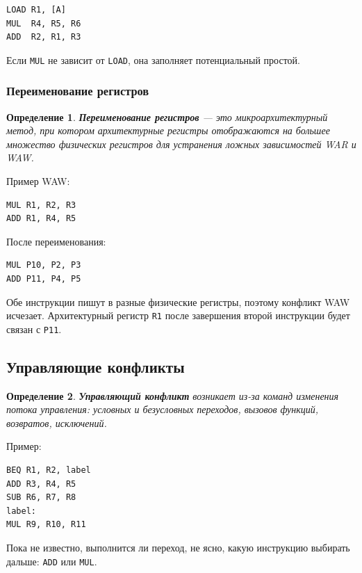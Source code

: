 \documentclass[12pt,a4paper]{article}
\newtheorem{definition}{Определение}
\begin{document}
\begin{lstlisting}
LOAD R1, [A]
MUL  R4, R5, R6
ADD  R2, R1, R3
\end{lstlisting}

Если \texttt{MUL} не зависит от \texttt{LOAD}, она заполняет потенциальный простой.

\subsubsection{Переименование регистров}

\begin{definition}
\textbf{Переименование регистров} --- это микроархитектурный метод, при котором архитектурные регистры отображаются на большее множество физических регистров для устранения ложных зависимостей WAR и WAW.
\end{definition}

Пример WAW:

\begin{lstlisting}
MUL R1, R2, R3
ADD R1, R4, R5
\end{lstlisting}

После переименования:

\begin{lstlisting}
MUL P10, P2, P3
ADD P11, P4, P5
\end{lstlisting}

Обе инструкции пишут в разные физические регистры, поэтому конфликт WAW исчезает. Архитектурный регистр \texttt{R1} после завершения второй инструкции будет связан с \texttt{P11}.

\subsection{Управляющие конфликты}

\begin{definition}
\textbf{Управляющий конфликт} возникает из-за команд изменения потока управления: условных и безусловных переходов, вызовов функций, возвратов, исключений.
\end{definition}

Пример:

\begin{lstlisting}
BEQ R1, R2, label
ADD R3, R4, R5
SUB R6, R7, R8
label:
MUL R9, R10, R11
\end{lstlisting}

Пока не известно, выполнится ли переход, не ясно, какую инструкцию выбирать дальше: \texttt{ADD} или \texttt{MUL}.
\end{document}
